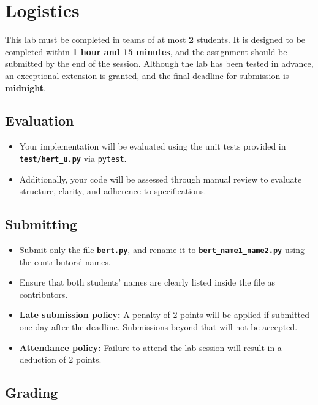 \documentclass{../../../extra/aakpract/aakpract}
\begin{document}
\newpage
\section{Logistics}

This lab must be completed in teams of at most \textbf{2} students.
It is designed to be completed within \textbf{1 hour and 15 minutes}, and the assignment should be submitted by the end of the session.
Although the lab has been tested in advance, an exceptional extension is granted, and the final deadline for submission is \textbf{midnight}.

\subsection{Evaluation}

\begin{itemize}
	\item Your implementation will be evaluated using the unit tests provided in \textbf{\texttt{test/bert\_u.py}} via \texttt{pytest}.
	\item Additionally, your code will be assessed through manual review to evaluate structure, clarity, and adherence to specifications.
\end{itemize}

\subsection{Submitting}

\begin{itemize}
	\item Submit only the file \textbf{\texttt{bert.py}}, and rename it to \textbf{\texttt{bert\_name1\_name2.py}} using the contributors' names.
	\item Ensure that both students' names are clearly listed inside the file as contributors.
	\item \textbf{Late submission policy:} A penalty of 2 points will be applied if submitted one day after the deadline. 
	Submissions beyond that will not be accepted.
	\item \textbf{Attendance policy:} Failure to attend the lab session will result in a deduction of 2 points.
\end{itemize}

\subsection{Grading}
\end{document}
